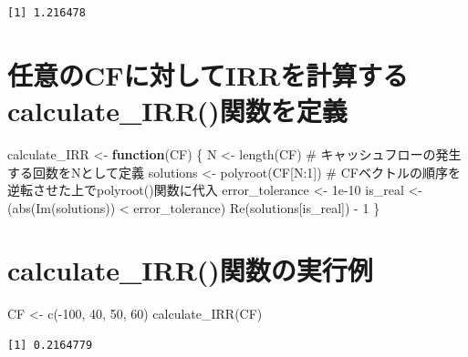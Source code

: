 \documentclass[
  letterpaper,
  DIV=11,
  numbers=noendperiod]{scrreprt}
\newenvironment{Shaded}{\begin{snugshade}}{\end{snugshade}}
\newcommand{\CommentTok}[1]{\textcolor[rgb]{0.37,0.37,0.37}{#1}}
\newcommand{\ControlFlowTok}[1]{\textcolor[rgb]{0.00,0.23,0.31}{\textbf{#1}}}
\newcommand{\DecValTok}[1]{\textcolor[rgb]{0.68,0.00,0.00}{#1}}
\newcommand{\FloatTok}[1]{\textcolor[rgb]{0.68,0.00,0.00}{#1}}
\newcommand{\FunctionTok}[1]{\textcolor[rgb]{0.28,0.35,0.67}{#1}}
\newcommand{\NormalTok}[1]{\textcolor[rgb]{0.00,0.23,0.31}{#1}}
\newcommand{\OtherTok}[1]{\textcolor[rgb]{0.00,0.23,0.31}{#1}}
\newcommand{\SpecialCharTok}[1]{\textcolor[rgb]{0.37,0.37,0.37}{#1}}
\begin{document}
\begin{verbatim}
[1] 1.216478
\end{verbatim}

\section{任意のCFに対してIRRを計算するcalculate\_IRR()関数を定義}\label{ux4efbux610fux306ecfux306bux5bfeux3057ux3066irrux3092ux8a08ux7b97ux3059ux308bcalculate_irrux95a2ux6570ux3092ux5b9aux7fa9}

\begin{Shaded}
\begin{Highlighting}[]
\NormalTok{calculate\_IRR }\OtherTok{\textless{}{-}} \ControlFlowTok{function}\NormalTok{(CF) \{}
\NormalTok{  N }\OtherTok{\textless{}{-}} \FunctionTok{length}\NormalTok{(CF) }\CommentTok{\# キャッシュフローの発生する回数をNとして定義}
\NormalTok{  solutions }\OtherTok{\textless{}{-}} \FunctionTok{polyroot}\NormalTok{(CF[N}\SpecialCharTok{:}\DecValTok{1}\NormalTok{]) }\CommentTok{\# CFベクトルの順序を逆転させた上でpolyroot()関数に代入}
\NormalTok{  error\_tolerance }\OtherTok{\textless{}{-}} \FloatTok{1e{-}10}
\NormalTok{  is\_real }\OtherTok{\textless{}{-}}\NormalTok{ (}\FunctionTok{abs}\NormalTok{(}\FunctionTok{Im}\NormalTok{(solutions)) }\SpecialCharTok{\textless{}}\NormalTok{ error\_tolerance)}
  \FunctionTok{Re}\NormalTok{(solutions[is\_real]) }\SpecialCharTok{{-}} \DecValTok{1}
\NormalTok{\}}
\end{Highlighting}
\end{Shaded}

\section{calculate\_IRR()関数の実行例}\label{calculate_irrux95a2ux6570ux306eux5b9fux884cux4f8b}

\begin{Shaded}
\begin{Highlighting}[]
\NormalTok{CF }\OtherTok{\textless{}{-}} \FunctionTok{c}\NormalTok{(}\SpecialCharTok{{-}}\DecValTok{100}\NormalTok{, }\DecValTok{40}\NormalTok{, }\DecValTok{50}\NormalTok{, }\DecValTok{60}\NormalTok{)}
\FunctionTok{calculate\_IRR}\NormalTok{(CF)}
\end{Highlighting}
\end{Shaded}

\begin{verbatim}
[1] 0.2164779
\end{verbatim}
\end{document}
